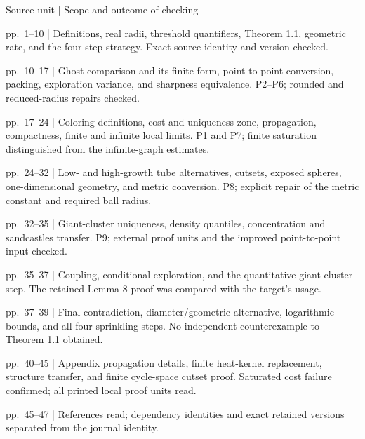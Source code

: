 \documentclass[10pt]{article}
\begin{document}
Source unit | Scope and outcome of checking\par
pp. 1–10 | Definitions, real radii, threshold quantifiers, Theorem 1.1, geometric rate, and the four-step strategy. Exact source identity and version checked.\par
pp. 10–17 | Ghost comparison and its finite form, point-to-point conversion, packing, exploration variance, and sharpness equivalence. P2–P6; rounded and reduced-radius repairs checked.\par
pp. 17–24 | Coloring definitions, cost and uniqueness zone, propagation, compactness, finite and infinite local limits. P1 and P7; finite saturation distinguished from the infinite-graph estimates.\par
pp. 24–32 | Low- and high-growth tube alternatives, cutsets, exposed spheres, one-dimensional geometry, and metric conversion. P8; explicit repair of the metric constant and required ball radius.\par
pp. 32–35 | Giant-cluster uniqueness, density quantiles, concentration and sandcastles transfer. P9; external proof units and the improved point-to-point input checked.\par
pp. 35–37 | Coupling, conditional exploration, and the quantitative giant-cluster step. The retained Lemma 8 proof was compared with the target’s usage.\par
pp. 37–39 | Final contradiction, diameter/geometric alternative, logarithmic bounds, and all four sprinkling steps. No independent counterexample to Theorem 1.1 obtained.\par
pp. 40–45 | Appendix propagation details, finite heat-kernel replacement, structure transfer, and finite cycle-space cutset proof. Saturated cost failure confirmed; all printed local proof units read.\par
pp. 45–47 | References read; dependency identities and exact retained versions separated from the journal identity.\par
\end{document}
